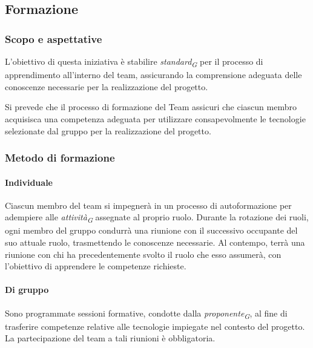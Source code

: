 \subsection{Formazione}
\subsubsection{Scopo e aspettative}
L'obiettivo di questa iniziativa è stabilire \textit{standard}\textsubscript{\textit{G}} per il processo di apprendimento all'interno del team, assicurando la comprensione adeguata delle conoscenze necessarie per la realizzazione del progetto.

\vspace*{0.1cm}

Si prevede che il processo di formazione del Team assicuri che ciascun membro acquisisca una competenza adeguata per utilizzare consapevolmente le tecnologie selezionate dal gruppo per la realizzazione del progetto.

\subsubsection{Metodo di formazione}
\paragraph{Individuale}
Ciascun membro del team si impegnerà in un processo di autoformazione per adempiere alle \textit{attività}\textsubscript{\textit{G}} assegnate al proprio ruolo. Durante la rotazione dei ruoli, ogni membro del gruppo condurrà una riunione con il successivo occupante del suo attuale ruolo, trasmettendo le conoscenze necessarie. Al contempo, terrà una riunione con chi ha precedentemente svolto il ruolo che esso assumerà, con l'obiettivo di apprendere le competenze richieste. 

\paragraph{Di gruppo}
Sono programmate sessioni formative, condotte dalla \textit{proponente}\textsubscript{\textit{G}}, al fine di trasferire competenze relative alle tecnologie impiegate nel contesto del progetto. La partecipazione del team a tali riunioni è obbligatoria. 
